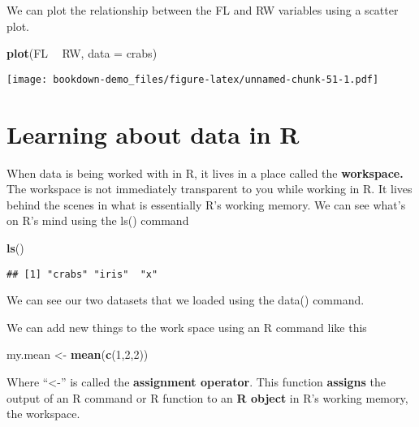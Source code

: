\documentclass[]{book}
\newenvironment{Shaded}{\begin{snugshade}}{\end{snugshade}}
\newcommand{\KeywordTok}[1]{\textcolor[rgb]{0.13,0.29,0.53}{\textbf{#1}}}
\newcommand{\DataTypeTok}[1]{\textcolor[rgb]{0.13,0.29,0.53}{#1}}
\newcommand{\DecValTok}[1]{\textcolor[rgb]{0.00,0.00,0.81}{#1}}
\newcommand{\StringTok}[1]{\textcolor[rgb]{0.31,0.60,0.02}{#1}}
\newcommand{\OperatorTok}[1]{\textcolor[rgb]{0.81,0.36,0.00}{\textbf{#1}}}
\newcommand{\NormalTok}[1]{#1}
\theoremstyle{definition}
\theoremstyle{definition}
\theoremstyle{definition}
\theoremstyle{remark}
\begin{document}
We can plot the relationship between the FL and RW variables using a
scatter plot.

\begin{Shaded}
\begin{Highlighting}[]
\KeywordTok{plot}\NormalTok{(FL }\OperatorTok{~}\StringTok{ }\NormalTok{RW, }\DataTypeTok{data =}\NormalTok{ crabs)}
\end{Highlighting}
\end{Shaded}

\texttt{[image: bookdown-demo\_files/figure-latex/unnamed-chunk-51-1.pdf]}

\section{Learning about data in R}\label{learning-about-data-in-r}

When data is being worked with in R, it lives in a place called the
\textbf{workspace.} The workspace is not immediately transparent to you
while working in R. It lives behind the scenes in what is essentially
R's working memory. We can see what's on R's mind using the ls() command

\begin{Shaded}
\begin{Highlighting}[]
\KeywordTok{ls}\NormalTok{()}
\end{Highlighting}
\end{Shaded}

\begin{verbatim}
## [1] "crabs" "iris"  "x"
\end{verbatim}

We can see our two datasets that we loaded using the data() command.

We can add new things to the work space using an R command like this

\begin{Shaded}
\begin{Highlighting}[]
\NormalTok{my.mean <-}\StringTok{ }\KeywordTok{mean}\NormalTok{(}\KeywordTok{c}\NormalTok{(}\DecValTok{1}\NormalTok{,}\DecValTok{2}\NormalTok{,}\DecValTok{2}\NormalTok{))}
\end{Highlighting}
\end{Shaded}

Where ``\textless{}-'' is called the \textbf{assignment operator}. This
function \textbf{assigns} the output of an R command or R function to an
\textbf{R object} in R's working memory, the workspace.
\end{document}
